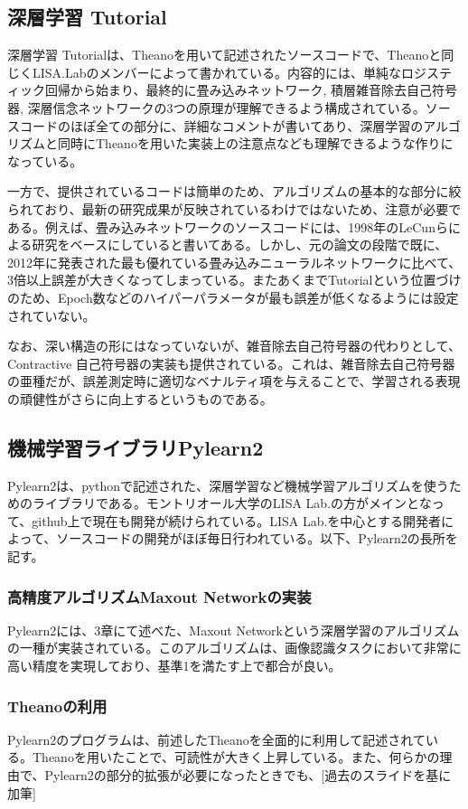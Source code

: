 \subsection{深層学習 Tutorial}
深層学習 Tutorialは、Theanoを用いて記述されたソースコードで、Theanoと同じくLISA.Labのメンバーによって書かれている。内容的には、単純なロジスティック回帰から始まり、最終的に畳み込みネットワーク, 積層雑音除去自己符号器, 深層信念ネットワークの3つの原理が理解できるよう構成されている。ソースコードのほぽ全ての部分に、詳細なコメントが書いてあり、深層学習のアルゴリズムと同時にTheanoを用いた実装上の注意点なども理解できるような作りになっている。\par
一方で、提供されているコードは簡単のため、アルゴリズムの基本的な部分に絞られており、最新の研究成果が反映されているわけではないため、注意が必要である。例えば、畳み込みネットワークのソースコードには、1998年のLeCunらによる研究\cite{lecun1998gradient-based}をベースにしていると書いてある。しかし、元の論文の段階で既に、2012年に発表された最も優れている畳み込みニューラルネットワーク\cite{ciresan2012multi-column}に比べて、3倍以上誤差が大きくなってしまっている。またあくまでTutorialという位置づけのため、Epoch数などのハイパーパラメータが最も誤差が低くなるようには設定されていない。\par
なお、深い構造の形にはなっていないが、雑音除去自己符号器の代わりとして、Contractive 自己符号器\cite{rifai2011contractive}\cite{rifai2011learning}の実装も提供されている。これは、雑音除去自己符号器の亜種だが、誤差測定時に適切なベナルティ項を与えることで、学習される表現の頑健性がさらに向上するというものである。

\subsection{機械学習ライブラリPylearn2}
Pylearn2は、pythonで記述された、深層学習など機械学習アルゴリズムを使うためのライブラリである\cite{goodfellow2013Pylearn2:}。モントリオール大学のLISA Lab.の方がメインとなって、github上で現在も開発が続けられている。LISA Lab.を中心とする開発者によって、ソースコードの開発がほぼ毎日行われている。以下、Pylearn2の長所を記す。
\subsubsection{高精度アルゴリズムMaxout Networkの実装}
Pylearn2には、3章にて述べた、Maxout Networkという深層学習のアルゴリズムの一種が実装されている。このアルゴリズムは、画像認識タスクにおいて非常に高い精度を実現しており、基準1を満たす上で都合が良い。
\subsubsection{Theanoの利用}
Pylearn2のプログラムは、前述したTheanoを全面的に利用して記述されている。Theanoを用いたことで、可読性が大きく上昇している。また、何らかの理由で、Pylearn2の部分的拡張が必要になったときでも、[過去のスライドを基に加筆]
